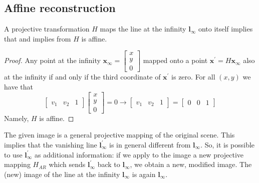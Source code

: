 \documentclass[12pt, a4paper]{report}
\begin{document}
    \subsection{Affine reconstruction}
    \begin{theorem}
        A projective transformation $H$ maps the line at the infinity $\boldsymbol{l}_{\infty}$ onto itself implies that and implies from $H$ is affine. 
    \end{theorem}
    \begin{proof}
        Any point at the infinity $\boldsymbol{x}_{\infty}=\begin{bmatrix} x \\ y \\ 0 \end{bmatrix}$ mapped onto a point 
        $\boldsymbol{x}^{'}=H\boldsymbol{x}_{\infty}$ also at the infinity if and only if the third coordinate of $\boldsymbol{x}^{'}$ is 
        zero. For all $(x,y)$ we have that 
        \[\begin{bmatrix} v_1 & v_2 & 1 \end{bmatrix} \begin{bmatrix} x \\ y \\ 0 \end{bmatrix}=0 \rightarrow \begin{bmatrix} v_1 & v_2 & 1 \end{bmatrix} = \begin{bmatrix} 0 & 0 & 1 \end{bmatrix}\]
        Namely, $H$ is affine.
    \end{proof}
    The given image is a general projective mapping of the original scene. This implies that the vanishing line $\boldsymbol{l}^{'}_{\infty}$
    is in general different from  $\boldsymbol{l}_{\infty}$. So, it is possible to use $\boldsymbol{l}^{'}_{\infty}$ as additional 
    information: if we apply to the image a new projective mapping $H_{AR}$ which sends $\boldsymbol{l}^{'}_{\infty}$ back to 
    $\boldsymbol{l}_{\infty}$, we obtain a new, modified image. The (new) image of the line at the infinity $\boldsymbol{l}_{\infty}$ is 
    again $\boldsymbol{l}_{\infty}$. 
\end{document}
